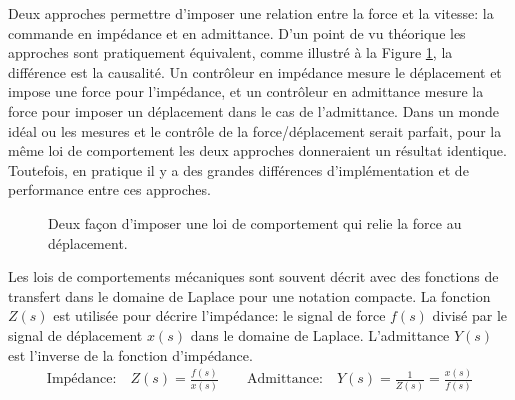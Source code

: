 Deux approches permettre d'imposer une relation entre la force et la vitesse: la commande en impédance et en admittance. D'un point de vu théorique les approches sont pratiquement équivalent, comme illustré à la Figure \ref{fig:impedanceadmitancecontrolbloc}, la différence est la causalité. Un contrôleur en impédance mesure le déplacement et impose une force pour l'impédance, et un contrôleur en admittance mesure la force pour imposer un déplacement dans le cas de l'admittance. Dans un monde idéal ou les mesures et le contrôle de la force/déplacement serait parfait, pour la même loi de comportement les deux approches donneraient un résultat identique. Toutefois, en pratique il y a des grandes différences d'implémentation et de performance entre ces approches. 
\begin{figure}[H]
        \centering
				\hspace{30pt}
        \caption{Deux façon d'imposer une loi de comportement qui relie la force au déplacement.}
				\label{fig:impedanceadmitancecontrolbloc}
\end{figure}

Les lois de comportements mécaniques sont souvent décrit avec des fonctions de transfert dans le domaine de Laplace pour une notation compacte. La fonction $Z(s)$ est utilisée pour décrire l'impédance: le signal de force $f(s)$ divisé par le signal de déplacement $x(s)$ dans le domaine de Laplace. L'admittance $Y(s)$ est l'inverse de la fonction d'impédance. 
\begin{align}
\text{Impédance:} \quad Z(s) = \frac{f(s)}{x(s)} \quad\quad \text{Admittance:} \quad Y(s) =  \frac{1}{Z(s)} = \frac{x(s)}{f(s)}
\end{align}

